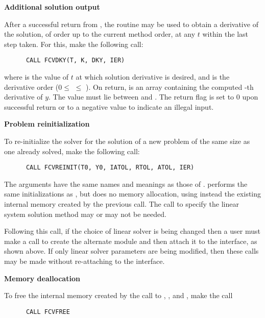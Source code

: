 \begin{Steps}
\item {\bf Additional solution output}

  After a successful return from , the routine  may be
  used to obtain a derivative of the solution, of order up to the current method
  order, at any $t$ within the last step taken.  For this, make the following call:
\begin{verbatim}
      CALL FCVDKY(T, K, DKY, IER)
\end{verbatim}
  where
   is the value of $t$ at which solution derivative is desired, and
   is the derivative order ($0 \le$  $\le$ ).
  On return,  is an array containing the computed -th derivative
  of $y$.  The value  must lie between  and .
  The return flag  is set to $0$ upon successful return or to a negative
  value to indicate an illegal input.
  
\item {\bf Problem reinitialization}

  To re-initialize the {\cvode} solver for the solution of a new problem
  of the same size as one already solved, make the following call:
\begin{verbatim}
      CALL FCVREINIT(T0, Y0, IATOL, RTOL, ATOL, IER)
\end{verbatim}
  The arguments have the same names and meanings as those of .
   performs the same initializations as
  , but does no memory allocation, using instead the existing
  internal memory created by the previous  call.  The call to
  specify the linear system solution method may or may not be needed.

  Following this call, if the choice of linear solver is being changed
  then a user must make a call to create the alternate {\sunlinsol}
  module and then attach it to the {\cvls} interface, as shown above.
  If only linear solver parameters are being modified, then these
  calls may be made without re-attaching to the {\cvls} interface. 


\item {\bf Memory deallocation}

  To free the internal memory created by the call to ,
  ,  and , make the call
\begin{verbatim}
      CALL FCVFREE
\end{verbatim}

\end{Steps}


